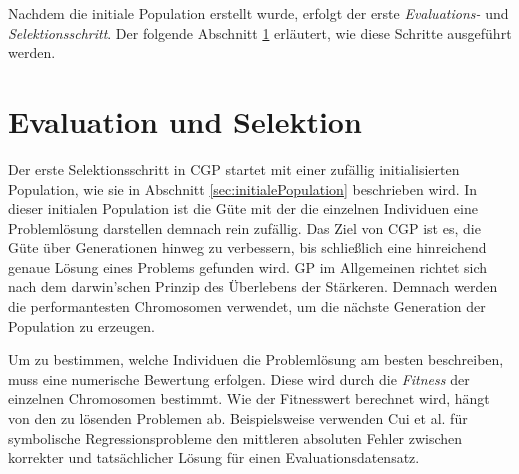 Nachdem die initiale Population erstellt wurde, erfolgt der erste \emph{Evaluations-} und \emph{Selektionsschritt}. 
Der folgende Abschnitt \ref{sec:evalUndSelektion} erläutert, wie diese Schritte ausgeführt werden.


\section{Evaluation und Selektion}
\label{sec:evalUndSelektion}

Der erste Selektionsschritt in CGP startet mit einer zufällig initialisierten Population, wie sie in Abschnitt \ref{sec:initialePopulation} beschrieben wird.
In dieser initialen Population ist die Güte mit der die einzelnen Individuen eine Problemlösung darstellen demnach rein zufällig.
Das Ziel von CGP ist es, die Güte über Generationen hinweg zu verbessern, bis schließlich eine hinreichend genaue Lösung eines Problems gefunden wird.
GP im Allgemeinen richtet sich nach dem darwin'schen Prinzip des Überlebens der Stärkeren.
Demnach werden die performantesten Chromosomen verwendet, um die nächste Generation der Population zu erzeugen. \cite{koza_survey_1995}

Um zu bestimmen, welche Individuen die Problemlösung am besten beschreiben, muss eine numerische Bewertung erfolgen.
Diese wird durch die \emph{Fitness} der einzelnen Chromosomen bestimmt. \cite{koza_survey_1995}
Wie der Fitnesswert berechnet wird, hängt von den zu lösenden Problemen ab.
Beispielsweise verwenden Cui et al. für symbolische Regressionsprobleme den mittleren absoluten Fehler zwischen korrekter und tatsächlicher Lösung für einen Evaluationsdatensatz. \cite{affenzeller_positional_2024}

